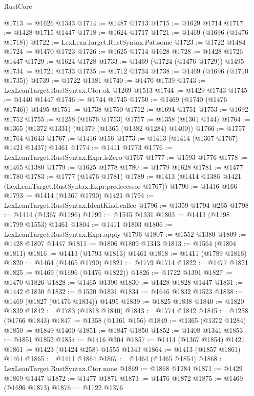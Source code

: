 \begin{lexlean}{RustCore}
\begin{coremodule}
@1713 := @1626 @1343
@1714 := @1487 @1713
@1715 := @1629 @1714
@1717 := @1428 @1715 @1447
@1718 := @1624 @1717
@1721 := @1469 (@1696 (@1476 @1718))
@1722 := LexLeanTarget.RustSyntax.Pat.some
@1723 := @1722 @1484
@1724 := @1470 @1723
@1726 := @1625 @1714 @1628
@1728 := @1428 @1726 @1447
@1729 := @1624 @1728
@1733 := @1469 (@1724 (@1476 @1729)) @1495
@1734 := @1721 @1733
@1735 := @1712 @1734
@1738 := @1469 (@1696 (@1710 @1735))
@1739 := @1722 @1381
@1740 := @1470 @1739
@1743 := LexLeanTarget.RustSyntax.Ctor.ok @1269 @1513
@1744 := @1429 @1743
@1745 := @1440 @1447
@1746 := @1744 @1745
@1750 := @1469 (@1740 (@1476 @1746)) @1495
@1751 := @1738 @1750
@1752 := @1694 @1751
@1753 := @1692 @1752
@1755 := @1258 (@1676 @1753)
@1757 := @1358 (@1361 @144)
@1764 := @1365 (@1372 @1331) (@1379 (@1365 (@1382 @1284) @1400))
@1766 := @1757 @1764 @1643
@1767 := @1416 @156
@1773 := @1413 (@1414 (@1367 @1767) @1421 @1437) @1461
@1774 := @1411 @1773
@1776 := LexLeanTarget.RustSyntax.Expr.isZero @1767
@1777 := @1593 @1776
@1778 := @1465 @1380
@1779 := @1625 @1778
@1780 := @1779 @1628
@1781 := @1477 @1780
@1783 := @1777 (@1476 @1781)
@1789 := @1413 (@1414 @1386 @1421 (LexLeanTarget.RustSyntax.Expr.predecessor @1767))
@1790 := @1416 @166
@1793 := @1414 (@1367 @1790) @1421
@1794 := LexLeanTarget.RustSyntax.IdentKind.callee
@1796 := @1359 @1794 @265
@1798 := @1414 (@1367 @1796)
@1799 := @1545 @1331
@1803 := @1413 (@1798 @1799 @1553) @1461
@1804 := @1411 @1803
@1806 := LexLeanTarget.RustSyntax.Expr.apply @1796
@1807 := @1552 @1380
@1809 := @1428 @1807 @1447
@1811 := @1806 @1809 @1343
@1813 := @1564 (@1804 @1811)
@1816 := @1413 (@1793 @1813) @1461
@1818 := @1411 (@1789 @1816)
@1820 := @1464 (@1465 @1790)
@1821 := @1779 @1714
@1822 := @1477 @1821
@1825 := @1469 (@1696 (@1476 @1822))
@1826 := @1722 @1391
@1827 := @1470 @1826
@1828 := @1465 @1390
@1830 := @1428 @1828 @1447
@1831 := @1442 @1830
@1832 := @1520 @1831
@1834 := @1646 @1832 @1523
@1838 := @1469 (@1827 (@1476 @1834)) @1495
@1839 := @1825 @1838
@1840 := @1820 @1839
@1842 := @1783 (@1818 @1840)
@1843 := @1774 @1842
@1845 := @1258 (@1766 @1843)
@1847 := @1358 (@1361 @156)
@1849 := @1365 (@1372 @1284)
@1850 := @1849 @1400
@1851 := @1847 @1850
@1852 := @1408 @1341
@1853 := @1851 @1852
@1854 := @1416 @304
@1857 := @1414 (@1367 @1854) @1421
@1861 := @1423 (@1424 @258) @1555 @1343
@1864 := @1413 (@1857 @1861) @1461
@1865 := @1411 @1864
@1867 := @1464 (@1465 @1854)
@1868 := LexLeanTarget.RustSyntax.Ctor.none
@1869 := @1868 @1284
@1871 := @1429 @1869 @1447
@1872 := @1477 @1871
@1873 := @1476 @1872
@1875 := @1469 (@1696 @1873)
@1876 := @1722 @1376

\end{coremodule}
\end{lexlean}
